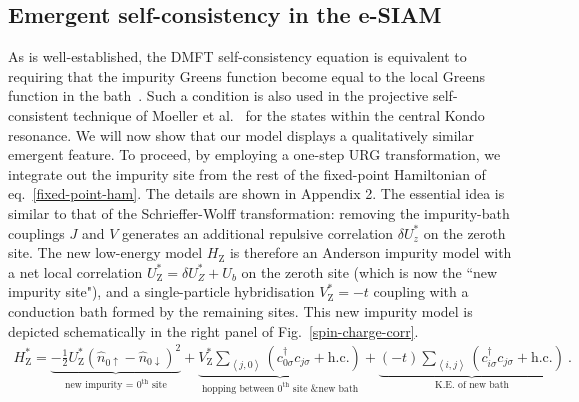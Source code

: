 \subsection{Emergent self-consistency in the e-SIAM}

As is well-established, the DMFT self-consistency equation is equivalent to requiring that the impurity Greens function become equal to the local Greens function in the bath~\cite{georges1996}.
Such a condition is also used in the projective self-consistent technique of Moeller et al.~\cite{moeller_1995} for the states within the central Kondo resonance.
We will now show that our model displays a qualitatively similar emergent feature.
To proceed, by employing a one-step URG transformation, we integrate out the impurity site from the rest of the fixed-point Hamiltonian of eq.~\eqref{fixed-point-ham}.
The details are shown in Appendix 2. The essential idea is similar to that of the Schrieffer-Wolff transformation: removing the impurity-bath couplings \(J\) and \(V\) generates an additional repulsive correlation \(\delta U_z^* \) on the zeroth site. The new low-energy model \(H_\text{Z}\) is therefore an Anderson impurity model with a net local correlation \(U_\text{Z}^* = \delta U_Z^* + U_b\) on the zeroth site (which is now the ``new impurity site"), and a single-particle hybridisation \(V_\text{Z}^* = -t\) coupling with a conduction bath formed by the remaining sites. This new impurity model is depicted schematically in the right panel of Fig.~\eqref{spin-charge-corr}.
\begin{eqnarray}
	H_\text{Z}^*  = \underbrace{-\frac{1}{2}U_\text{Z}^*\left(\hat n_{0\uparrow} - \hat n_{0\downarrow}\right)^2}_\text{new impurity = \(0^\text{th}\) site} + \underbrace{V_\text{Z}^*\sum_{\left<j,0 \right>}\left(c^\dagger_{0\sigma}c_{j\sigma} + \text{h.c.}\right)}_\text{hopping between \(0^\text{th}\) site \& new bath} + \underbrace{(-t) \sum_{\left<i,j \right>}\left(c^\dagger_{i\sigma}c_{j\sigma} + \text{h.c.}\right)}_\text{K.E. of new bath}~.
\end{eqnarray}

